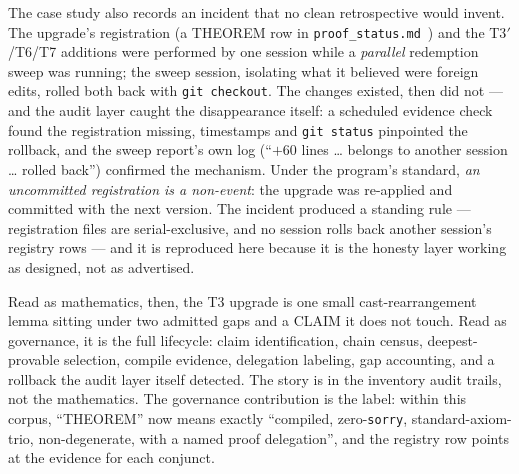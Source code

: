 The case study also records an incident that no clean retrospective
would invent. The upgrade's registration (a THEOREM row in
\texttt{proof\_status.md}~\cite{sylvaproofstatus2026}) and the
T3$'$/T6/T7 additions were
performed by one session while a \emph{parallel} redemption sweep
was running; the sweep session, isolating what it believed were
foreign edits, rolled both back with \texttt{git checkout}. The
changes existed, then did not --- and the audit layer caught the
disappearance itself: a scheduled evidence check found the
registration missing, timestamps and \texttt{git status}
pinpointed the rollback, and the sweep report's own log (``$+60$
lines \ldots{} belongs to another session \ldots{} rolled back'')
confirmed the mechanism. Under the program's standard,
\emph{an uncommitted registration is a non-event}: the upgrade was
re-applied and committed with the next version. The incident
produced a standing rule --- registration files are serial-exclusive,
and no session rolls back another session's registry rows --- and it
is reproduced here because it is the honesty layer working as
designed, not as advertised.

Read as mathematics, then, the T3 upgrade is one small
cast-rearrangement lemma sitting under two admitted gaps and a
CLAIM it does not touch. Read as governance, it is the full
lifecycle: claim identification, chain census, deepest-provable
selection, compile evidence, delegation labeling, gap accounting,
and a rollback the audit layer itself detected. The story is in
the inventory audit trails, not the mathematics. The governance
contribution is the label: within this corpus, ``THEOREM'' now
means exactly ``compiled, zero-\texttt{sorry},
standard-axiom-trio, non-degenerate, with a named proof
delegation'', and the registry row points at the evidence for
each conjunct.
